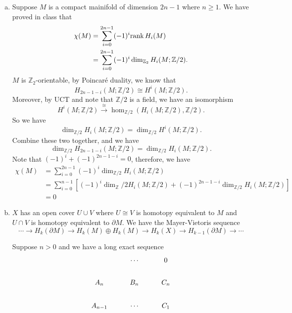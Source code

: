\documentclass[letterpaper, 12pt]{article}
\begin{document}
\begin{solution}
\begin{enumerate}[(a)]
\item Suppose \(M\) is a compact mainifold of dimension \(2n-1\) where \(n\geq 1\). We have proved in class that 
\begin{align*}
    \chi(M)&=\sum_{i=0}^{2n-1} (-1)^{i}\text{rank}\, H_i(M)\\ 
           &=\sum_{i=0}^{2n-1} (-1)^i\dim_{\mathbb{Z}_2} H_i(M;\mathbb{Z}/2).
\end{align*}
\(M\) is \(\mathbb{Z}_2\)-orientable, by Poincaré duality, we know that 
\[H_{2n-1-i}(M;\mathbb{Z}/2)\cong H^{i}(M;\mathbb{Z}/2).\]
Moreover, by UCT and note that \(\mathbb{Z}/2\) is a field, we have an isomorphism
\[H^i(M;\mathbb{Z}/2)\xrightarrow{\cong} \hom_{\mathbb{Z}/2}(H_i(M;\mathbb{Z}/2),\mathbb{Z}/2).\]
So we have 
\[\dim_{\mathbb{Z}/2} H_i(M;\mathbb{Z}/2)=\dim_{\mathbb{Z}/2} H^i(M;\mathbb{Z}/2).\]
Combine these two together, and we have 
\[\dim_{\mathbb{Z}/2} H_{2n-1-i}(M;\mathbb{Z}/2)=\dim_{\mathbb{Z}/2} H_i (M;\mathbb{Z}/2).\]
Note that \((-1)^i+(-1)^{2n-1-i}=0\), therefore, we have 
\begin{align*}
    \chi(M)&=\sum_{i=0}^{2n-1}(-1)^i \dim_{\mathbb{Z}/2} H_i(M;\mathbb{Z}/2)\\ 
           &=\sum_{i=0}^{n-1} [(-1)^i \dim_\mathbb{Z}/2 H_i(M;\mathbb{Z}/2)+(-1)^{2n-1-i}\dim_{\mathbb{Z}/2} H_i(M;\mathbb{Z}/2)]\\ 
           &=0
\end{align*}
\item \(X\) has an open cover \(U\cup V\) where \(U\cong V\) is homotopy equivalent to \(M\) and \(U\cap V\) is homotopy equivalent to \(\partial M\). We have the Mayer-Vietoris sequence 
\[\cdots\rightarrow H_k(\partial M)\rightarrow H_k(M)\oplus H_k(M)\rightarrow H_k(X)\rightarrow H_{k-1}(\partial M)\rightarrow \cdots\]
\begin{claim}
Suppose \(n>0\) and we have a long exact sequence
\[\begin{tikzcd}
	& \cdots & 0 \\
	{A_n} & {B_n} & {C_n} \\
	{A_{n-1}} & \cdots & {C_1} \\

\end{tikzcd}\]
\end{claim}
\end{enumerate}
\end{solution}
\end{document}
